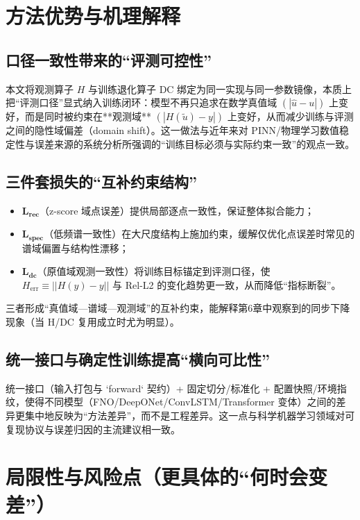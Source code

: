 \section{方法优势与机理解释}

\subsection{口径一致性带来的“评测可控性”}

本文将观测算子 \( H \) 与训练退化算子 \( \mathrm{DC} \) 绑定为同一实现与同一参数镜像，本质上把“评测口径”显式纳入训练闭环：模型不再只追求在数学真值域 \( (|\hat{u}-u|) \) 上变好，而是同时被约束在**观测域** \( (|H(\tilde{u})-y|) \) 上变好，从而减少训练与评测之间的隐性域偏差（domain shift）。这一做法与近年来对 PINN/物理学习数值稳定性与误差来源的系统分析所强调的“训练目标必须与实际约束一致”的观点一致。\cite{Cuomo2022}

\subsection{三件套损失的“互补约束结构”}

\begin{itemize}
    \item \(\mathbf{L_{\text{rec}}}\)（z-score 域点误差）提供局部逐点一致性，保证整体拟合能力；
    \item \(\mathbf{L_{\text{spec}}}\)（低频谱一致性）在大尺度结构上施加约束，缓解仅优化点误差时常见的谱域偏置与结构性漂移；
    \item \(\mathbf{L_{\text{dc}}}\)（原值域观测一致性）将训练目标锚定到评测口径，使 \( H_{\text{err}} \equiv ||H(\hat{y}) - y|| \) 与 Rel-L2 的变化趋势更一致，从而降低“指标断裂”。
\end{itemize}

三者形成“真值域—谱域—观测域”的互补约束，能解释第6章中观察到的同步下降现象（当 H/DC 复用成立时尤为明显）。

\subsection{统一接口与确定性训练提高“横向可比性”}

统一接口（输入打包与 `forward` 契约）+ 固定切分/标准化 + 配置快照/环境指纹，使得不同模型（FNO/DeepONet/ConvLSTM/Transformer 变体）之间的差异更集中地反映为“方法差异”，而不是工程差异。这一点与科学机器学习领域对可复现协议与误差归因的主流建议相一致。\cite{Cuomo2022}

\section{局限性与风险点（更具体的“何时会变差”）}

